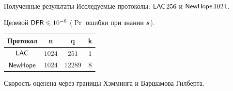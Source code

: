 \documentclass[notheorems]{beamer}
\begin{document}
\begin{frame}{Полученные результаты}
Исследуемые протоколы: $\LAC\,256$ и $\NewHope\,1024$.

Целевой $\DFR \leq 10^{-6}$ ($\Pr$ ошибки при знании $\bold s$).

\begin{table}[h]
	\centering
	\begin{tabular}{|c|c|c|c|}
		\hline Протокол & n & q & k \\ \hline
		$\LAC$ & $1024$ & $251$ & $1$ \\ \hline
		$\NewHope$ & $1024$ & $12289$ & $8$ \\ \hline
	\end{tabular}
\end{table}

\pause
\smallskip
Скорость оценена через границы Хэмминга и Варшамова-Гилберта.



\end{frame}
\end{document}
